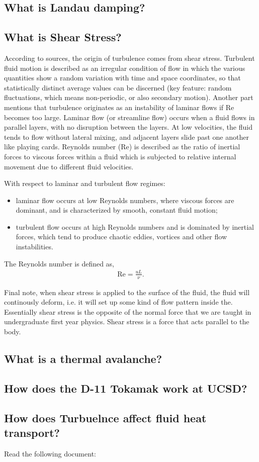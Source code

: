 \subsection{What is Landau damping?}

\subsection{What is Shear Stress?}
According to sources, the origin of turbulence comes from shear stress. Turbulent fluid motion is described as an irregular condition of flow in which the various quantities show a random variation with time and space coordinates, so that statistically distinct average values can be discerned (key feature: random fluctuations, which means non-periodic, or also secondary motion). Another part mentions that turbulence originates as an instability of laminar flows if Re becomes too large. Laminar flow (or streamline flow) occurs when a fluid flows in parallel layers, with no disruption between the layers. At low velocities, the fluid tends to flow without lateral mixing, and adjacent layers slide past one another like playing cards. Reynolds number (Re) is described as the ratio of inertial forces to viscous forces within a fluid which is subjected to relative internal movement due to different fluid velocities. 

\shear

With respect to laminar and turbulent flow regimes:
\begin{itemize}
	\item laminar flow occurs at low Reynolds numbers, where viscous forces are dominant, and is characterized by smooth, constant fluid motion;
	\item turbulent flow occurs at high Reynolds numbers and is dominated by inertial forces, which tend to produce chaotic eddies, vortices and other flow instabilities.
\end{itemize} 

The Reynolds number is defined as, 
\begin{align}
	\text{Re} = \frac{u L}{\nu}.
\end{align}

Final note, when shear stress is applied to the surface of the fluid, the fluid will continously deform, i.e. it will set up some kind of flow pattern inside the. Essentially shear stress is the opposite of the normal force that we are taught in undergraduate first year physics. Shear stress is a force that acts parallel to the body.

\subsection{What is a thermal avalanche?}

\subsection{How does the D-11 Tokamak work at UCSD?}

\subsection{How does Turbuelnce affect fluid heat transport?}
Read the following document: \cite{1992ApJ...388...64W}
 
